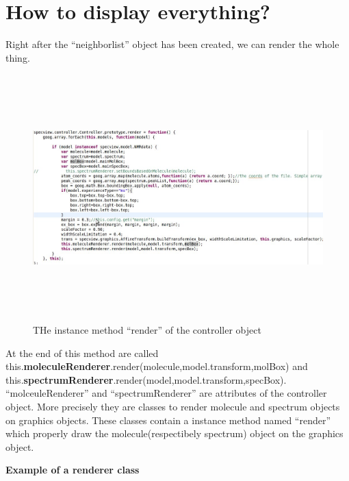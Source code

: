\section{How to display everything?}

Right after the ``neighborlist'' object has been created, we can render the whole thing.
    \begin{figure}[h]
    \begin{centering}
    \caption{THe instance method ``render'' of the controller object}
\includegraphics[width=200mm,height=95mm]{./images/renderController}
    \end{centering}
    \end{figure}

At the end of this method are called             this.\textbf{moleculeRenderer}.render(molecule,model.transform,molBox) and 
            this.\textbf{spectrumRenderer}.render(model,model.transform,specBox).
``molceuleRenderer'' and ``spectrumRenderer'' are attributes of the controller object. More precisely they are classes  to render molecule and spectrum objects on graphics objects. These classes contain a instance method named ``render'' which properly draw the molecule(respectibely spectrum) object on the graphics object.
\clearpage

\textbf{Example of a renderer class}

